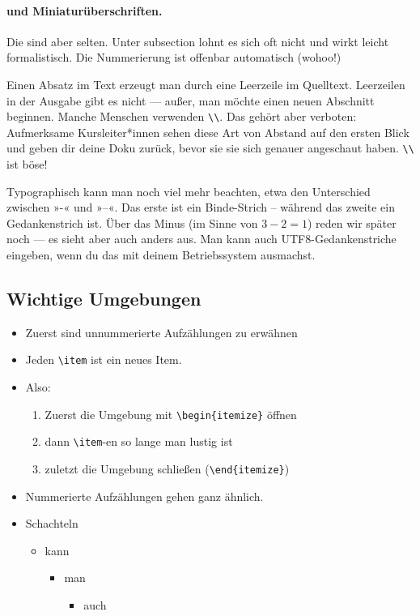 \documentclass{doku2018}
\begin{document}
\paragraph{und Miniaturüberschriften.} Die sind aber selten. Unter subsection
lohnt es sich oft nicht und wirkt leicht formalistisch. Die Nummerierung ist
offenbar automatisch (wohoo!)

Einen Absatz im Text erzeugt man durch eine Leerzeile im Quelltext. Leerzeilen
in der Ausgabe gibt es nicht — außer, man möchte einen neuen Abschnitt beginnen.
Manche Menschen verwenden \verb|\\|. Das gehört aber verboten: Aufmerksame
Kursleiter*innen sehen diese Art von Abstand auf den ersten Blick und geben dir
deine Doku zurück, bevor sie sie sich genauer angeschaut haben. \verb|\\| ist
böse!

Typographisch kann man noch viel mehr beachten, etwa den Unterschied zwischen
»-« und »--«. Das erste ist ein Binde-Strich -- während das zweite ein
Gedankenstrich ist. Über das Minus (im Sinne von $3-2=1$) reden wir später noch
— es sieht aber auch anders aus. Man kann auch UTF8-Gedankenstriche eingeben,
wenn du das mit deinem Betriebssystem ausmachst.

\subsection{Wichtige Umgebungen}

\begin{itemize}
\item Zuerst sind unnummerierte Aufzählungen zu erwähnen
\item Jeden \verb|\item| ist ein neues Item.
\item Also:
  \begin{enumerate}
  \item Zuerst die Umgebung mit \verb|\begin{itemize}| öffnen
    \item dann \verb|\item|-en so lange man lustig ist
    \item zuletzt die Umgebung schließen (\verb|\end{itemize}|)
  \end{enumerate}
\item Nummerierte Aufzählungen gehen ganz ähnlich.
\item Schachteln
  \begin{itemize}
  \item kann
    \begin{itemize}
    \item man
      \begin{itemize}
      \item auch
      \end{itemize}
    \end{itemize}
  \end{itemize}
\end{itemize}
\end{document}
